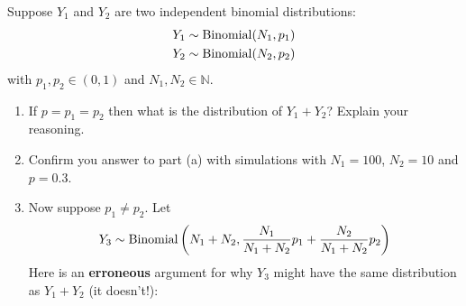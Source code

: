 \begin{exercise} Suppose $Y_1$ and $Y_2$ are two independent binomial distributions:
\begin{align*}
Y_1 &\sim {\rm Binomial}(N_1,p_1)\\
Y_2 &\sim {\rm Binomial}(N_2,p_2)
\end{align*}
with $p_1,p_2 \in (0,1)$ and $N_1,N_2 \in {\mathbb N}$.
\begin{enumerate}[label=(\alph*)]
\item If $p = p_1 = p_2$ then what is the distribution of $Y_1 + Y_2$? Explain your reasoning.
\item Confirm you answer to part (a) with simulations with $N_1 = 100$, $N_2 = 10$ and $p=0.3$. 
\item Now suppose $p_1 \ne p_2$. Let 
\begin{equation*}
Y_3 \sim {\rm Binomial}\left(N_1+N_2,\frac{N_1}{N_1+N_2}p_1 + \frac{N_2}{N_1+N_2}p_2\right)
\end{equation*}
Here is an {\bf erroneous} argument for why $Y_3$ might have the same distribution as $Y_1 + Y_2$ (it doesn't!): 


\end{enumerate}
\end{exercise}
